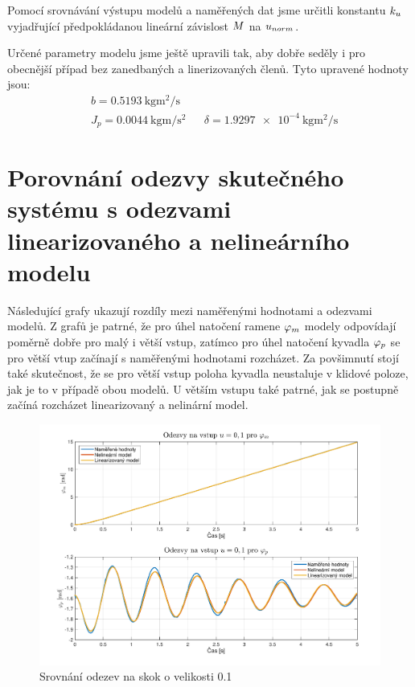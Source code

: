 \documentclass[11pt,a4paper]{article}
\begin{document}
 
Pomocí srovnávání výstupu modelů a naměřených dat jsme určitli konstantu $k_{u}$ vyjadřující předpokládanou lineární závislost $\M$ na $u_{norm}$.
 
Určené parametry modelu jsme ještě upravili tak, aby dobře seděly i pro obecnější případ bez zanedbaných a linerizovaných členů. Tyto upravené hodnoty jsou:
\begin{align*}
&b = \SI{0,5193}{\kilo \gram \meter \squared \per \second} \\
&J_p = \SI{0,0044}{\kilo \gram \metre \per \second \squared}	&&	\delta = \SI{1,9297e-4}{\kg \m \squared \per \second}
\end{align*}


\section{Porovnání odezvy skutečného systému s odezvami linearizovaného a nelineárního modelu}
Následující grafy ukazují rozdíly mezi naměřenými hodnotami a odezvami modelů. Z grafů je patrné, že pro úhel natočení ramene $\phin{m}$ modely odpovídají poměrně dobře pro malý i větší vstup, zatímco pro úhel natočení kyvadla $\phin{p}$ se pro větší vtup začínají s naměřenými hodnotami rozcházet. Za povšimnutí stojí také skutečnost, že se pro větší vstup poloha kyvadla neustaluje v klidové poloze, jak je to v případě obou modelů. U větším vstupu také patrné, jak se postupně začíná rozcházet linearizovaný a nelinární model.

\begin{figure}[H]
\centering
\includegraphics[scale=0.6]{Odezvy01.pdf}
\caption{Srovnání odezev na skok o velikosti 0.1}
\end{figure}
\end{document}
